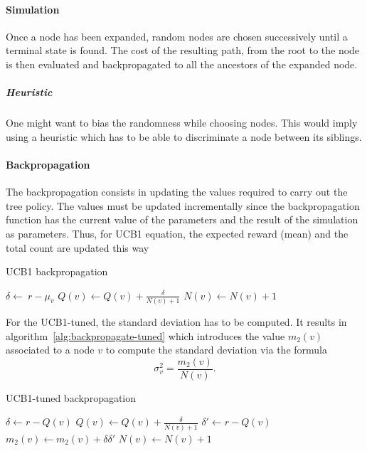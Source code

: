 \documentclass[twoside,twocolumn]{article}
\begin{document}
\paragraph{Simulation}
Once a node has been expanded, random nodes are chosen successively until a
terminal state is found. The cost of the resulting path, from the root to the
node is then evaluated and backpropagated to all the ancestors of the expanded
node.

\subparagraph{Heuristic} One might want to bias the randomness while choosing
nodes. This would imply using a heuristic which has to be able to discriminate
a node between its siblings.

\paragraph{Backpropagation}
The backpropagation consists in updating the values required to carry out the
tree policy. The values must be updated incrementally since the backpropagation
function has the current value of the parameters and the result of the
simulation as parameters. Thus, for UCB1 equation, the expected reward (mean)
and the total count are updated this way
\begin{algorithm}
  \caption{UCB1 backpropagation}
  \begin{algorithmic}
    \State{}\(\delta \gets\ r - \mu_v\)
    \State{}\(Q(v) \gets Q(v) + \frac{\delta}{N(v) + 1}\)
    \State{}\(N(v) \gets N(v) + 1\)
    \EndProcedure{}
  \end{algorithmic}
\end{algorithm}

For the UCB1-tuned, the standard deviation has to be computed. It results in
algorithm~\ref{alg:backpropagate-tuned} which introduces the value \(m_2(v)\)
associated to a node \(v\) to compute the standard deviation via the formula
\begin{equation}
  \sigma^2_v = \frac{m_2(v)}{N(v)}.
\end{equation}
\begin{algorithm}
  \caption{UCB1-tuned backpropagation}\label{alg:backpropagate-tuned}
  \begin{algorithmic}
    \State{}\(\delta \gets r - Q(v)\)
    \State{}\(Q(v) \gets Q(v) + \frac{\delta}{N(v) + 1}\)
    \State{}\(\delta' \gets r - Q(v)\)
    \State{}\(m_2(v) \gets m_2(v) + \delta \delta'\)
    \State{}\(N(v) \gets N(v) + 1\)
    \EndProcedure{}
  \end{algorithmic}
\end{algorithm}
\end{document}
